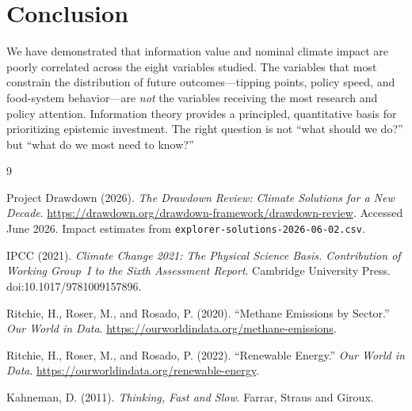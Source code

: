 \documentclass[10pt,twocolumn]{article}
\begin{document}
\section{Conclusion}

We have demonstrated that information value and nominal climate impact
are poorly correlated across the eight variables studied.  The variables
that most constrain the distribution of future outcomes---tipping points,
policy speed, and food-system behavior---are \emph{not} the variables
receiving the most research and policy attention.  Information theory
provides a principled, quantitative basis for prioritizing epistemic
investment.  The right question is not ``what should we do?'' but
``what do we most need to know?''


\begin{thebibliography}{9}

Project Drawdown (2026).
\textit{The Drawdown Review: Climate Solutions for a New Decade}.
\url{https://drawdown.org/drawdown-framework/drawdown-review}.
Accessed June 2026. Impact estimates from
\texttt{explorer-solutions-2026-06-02.csv}.

IPCC (2021).
\textit{Climate Change 2021: The Physical Science Basis.
Contribution of Working Group~I to the Sixth Assessment Report}.
Cambridge University Press.
doi:10.1017/9781009157896.

Ritchie, H., Roser, M., and Rosado, P. (2020).
``Methane Emissions by Sector.''
\textit{Our World in Data}.
\url{https://ourworldindata.org/methane-emissions}.

Ritchie, H., Roser, M., and Rosado, P. (2022).
``Renewable Energy.''
\textit{Our World in Data}.
\url{https://ourworldindata.org/renewable-energy}.

Kahneman, D. (2011).
\textit{Thinking, Fast and Slow}.
Farrar, Straus and Giroux.

\end{thebibliography}
\end{document}
